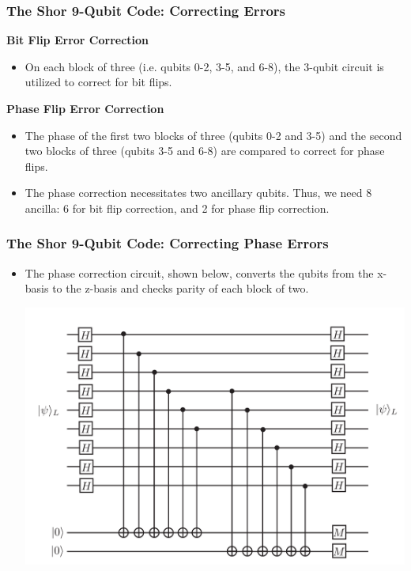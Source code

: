 \documentclass{beamer}
\begin{document}
\begin{frame}
    \frametitle{The Shor 9-Qubit Code: Correcting Errors}
    \textbf{Bit Flip Error Correction}
        \begin{itemize}
            \item On each block of three (i.e. qubits 0-2, 3-5, and 6-8), the 3-qubit circuit is utilized to correct for bit flips.
        \end{itemize}
        \textbf{Phase Flip Error Correction}
        \begin{itemize}
            \item The phase of the first two blocks of three (qubits 0-2 and 3-5) and the second two blocks of three (qubits 3-5 and 6-8) are compared to correct for phase flips.
            \item The phase correction necessitates two ancillary qubits. Thus, we need 8 ancilla: 6 for bit flip correction, and 2 for phase flip correction.
        \end{itemize}
\end{frame}

\begin{frame}
    \frametitle{The Shor 9-Qubit Code: Correcting Phase Errors}
        \begin{itemize}
            \item The phase correction circuit, shown below, converts the qubits from the x-basis to the z-basis and checks parity of each block of two.
            \begin{center}
            \includegraphics[scale=0.5]{9qbphase.PNG}
            \end{center}
        \end{itemize}
\end{frame}
\end{document}
